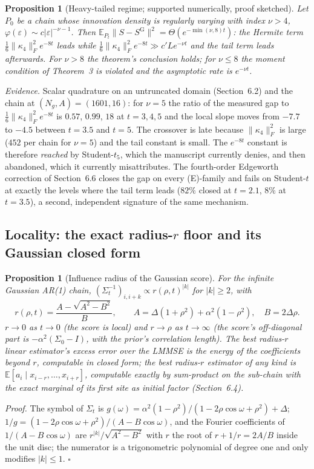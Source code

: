 \documentclass[11pt,a4paper]{article}
\newcommand{\Frob}[1]{\lVert #1 \rVert_{F}}
\newcommand{\E}{\mathbb{E}}
\newcommand{\Sg}{S^{\mathrm{G}}}
\newtheorem{proposition}[theorem]{Proposition}
\theoremstyle{definition}
\theoremstyle{remark}
\begin{document}
\begin{proposition}[Heavy-tailed regime; supported numerically, proof sketched]
\label{prop:heavy}
Let $P_0$ be a chain whose innovation density is regularly varying with index $\nu>4$, $\varphi(\varepsilon)\sim c|\varepsilon|^{-\nu-1}$. Then $\E_{P_t}\|S-\Sg\|^2=\Theta(e^{-\min(\nu,8)t})$: the Hermite term $\tfrac16\Frob{\kappa_4}^2e^{-8t}$ leads while $\tfrac16\Frob{\kappa_4}^2e^{-8t}\gg c'Le^{-\nu t}$ and the tail term leads afterwards. For $\nu>8$ the theorem's conclusion holds; for $\nu\le8$ the moment condition of Theorem~3 is violated and the asymptotic rate is $e^{-\nu t}$.
\end{proposition}
\noindent\emph{Evidence.} Scalar quadrature on an untruncated domain (Section~6.2) and the chain at $(N_g,A)=(1601,16)$: for $\nu=5$ the ratio of the measured gap to $\tfrac16\Frob{\kappa_4}^2e^{-8t}$ is $0.57$, $0.99$, $18$ at $t=3,4,5$ and the local slope moves from $-7.7$ to $-4.5$ between $t=3.5$ and $t=5$. The crossover is late because $\Frob{\kappa_4}^2$ is large ($452$ per chain for $\nu=5$) and the tail constant is small. The $e^{-8t}$ constant is therefore \emph{reached} by Student-$t_5$, which the manuscript currently denies, and then abandoned, which it currently misattributes. The fourth-order Edgeworth correction of Section~6.6 closes the gap on every (E)-family and fails on Student-$t$ at exactly the levels where the tail term leads ($82\%$ closed at $t=2.1$, $8\%$ at $t=3.5$), a second, independent signature of the same mechanism.

\subsection{Locality: the exact radius-$r$ floor and its Gaussian closed form}

\begin{proposition}[Influence radius of the Gaussian score]
\label{prop:radius}
For the infinite Gaussian AR(1) chain, $(\Sigma_t^{-1})_{i,i+k}\propto r(\rho,t)^{|k|}$ for $|k|\ge2$, with
\[
 r(\rho,t)=\frac{A-\sqrt{A^2-B^2}}{B},\qquad A=\Delta(1+\rho^2)+\alpha^2(1-\rho^2),\quad B=2\Delta\rho .
\]
$r\to0$ as $t\to0$ (the score is local) and $r\to\rho$ as $t\to\infty$ (the score's off-diagonal part is $-\alpha^2(\Sigma_0-I)$, with the prior's correlation length). The best radius-$r$ linear estimator's excess error over the LMMSE is the energy of the coefficients beyond $r$, computable in closed form; the best radius-$r$ estimator of any kind is $\E[a_i\mid x_{i-r},\dots,x_{i+r}]$, computable exactly by sum-product on the sub-chain with the exact marginal of its first site as initial factor (Section~6.4).
\end{proposition}
\noindent\emph{Proof.} The symbol of $\Sigma_t$ is $g(\omega)=\alpha^2(1-\rho^2)/(1-2\rho\cos\omega+\rho^2)+\Delta$; $1/g=(1-2\rho\cos\omega+\rho^2)/(A-B\cos\omega)$, and the Fourier coefficients of $1/(A-B\cos\omega)$ are $r^{|k|}/\sqrt{A^2-B^2}$ with $r$ the root of $r+1/r=2A/B$ inside the unit disc; the numerator is a trigonometric polynomial of degree one and only modifies $|k|\le1$. $\square$
\end{document}
